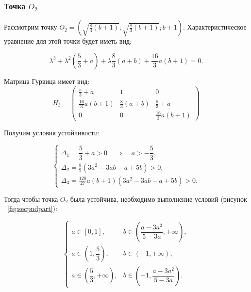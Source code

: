 \documentclass[14pt,a4paper]{extarticle}
\theoremstyle{plain}
\begin{document}
	\subsubsection{Точка $O_2$}
	
	Рассмотрим точку $O_2 = \left( \sqrt{\frac{8}{3}(b+1)}; \sqrt{\frac{8}{3}(b+1)}; b+1 \right)$. Характеристическое уравнение для этой точки будет иметь вид:
	
	\begin{equation}
		\lambda^3 + \lambda^2\left(\frac{5}{3}+a\right) + \lambda\frac{8}{3}\left(a+b\right) + \frac{16}{3}a(b+1) = 0.
		\nonumber
	\end{equation}
	
	Матрица Гурвица имеет вид:
	\begin{equation}
		H_3 = \begin{pmatrix}
			\frac{5}{3}+a & 1 & 0 \\[1ex]
			\frac{16}{3}a(b+1) & \frac{8}{3}(a+b) & \frac{5}{3}+a \\[1ex]
			0 & 0 & \frac{16}{3}a(b+1)
		\end{pmatrix}
		\label{eq:gurvits_matrix}
		\nonumber
	\end{equation}
	
	Получим условия устойчивости:
	
	\begin{equation}
		\begin{cases}
			\Delta_1 = \dfrac{5}{3} + a > 0 \quad \Rightarrow \quad a > -\dfrac{5}{3}, \\[12pt]
			\Delta_2 = \frac{8}{9}\left(3a^2 - 3ab - a + 5b\right) > 0,\\[12pt]
			\Delta_3 = \frac{128}{27}a(b+1)\left(3a^2 - 3ab - a + 5b\right) > 0.
		\end{cases}\nonumber
	\end{equation}
	
	Тогда чтобы точка $O_2$ была устойчива, необходимо выполнение условий (рисунок ~\ref{fig:secpndpart}):
	
	\begin{equation}
		\begin{cases}
			a \in [0,1], & b \in \left(\dfrac{a-3a^2}{5-3a}, +\infty\right), \\[12pt]
			a \in \left(1,\dfrac{5}{3}\right), & b \in (-1, +\infty), \\[12pt]
			a \in \left(\dfrac{5}{3}, + \infty\right), & b \in \left(-1, \dfrac{a-3a^2}{5-3a}\right).
		\end{cases}
		\nonumber
	\end{equation}
	
\end{document}
